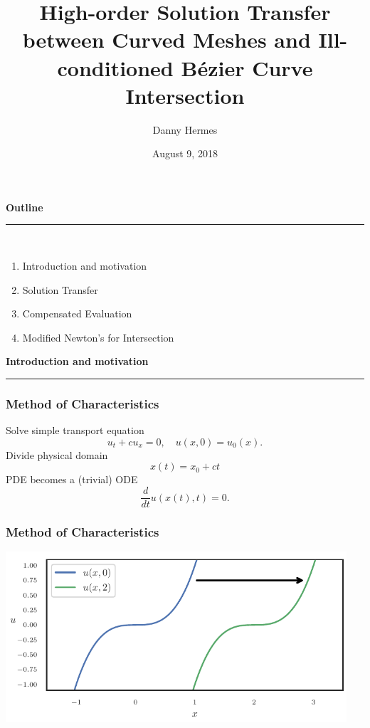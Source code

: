 \documentclass{beamer}
\title[Lagrange and B\'{e}zier]
  {High-order Solution Transfer between Curved Meshes and
  Ill-conditioned B\'{e}zier Curve Intersection}
\date{August 9, 2018}
\author{Danny Hermes}
\institute{{\lmss dhermes@berkeley.edu} \\
           UC Berkeley}
\begin{document}
\maketitle

\begin{frame}
\centering
{\Large\bf Outline} \\
\rule{0.82\textwidth}{1pt} \\[20pt]
\begin{minipage}{0.78\textwidth}\raggedright
\begin{enumerate}
\item Introduction and motivation
\item Solution Transfer
\item Compensated Evaluation
\item Modified Newton's for Intersection
\end{enumerate}
\end{minipage}
\end{frame}


\begin{frame}
\centering
{\Large \bf Introduction and motivation}
\rule{0.82\textwidth}{1pt}
\end{frame}

\begin{frame}
\frametitle{Method of Characteristics}
\pause
Solve simple transport equation
\begin{equation*}
u_t + c u_x = 0, \quad u(x, 0) = u_0(x).
\end{equation*}
\pause
Divide physical domain
\begin{equation*}
x(t) = x_0 + ct
\end{equation*}
\pause
PDE becomes a (trivial) ODE
\begin{equation*}
\frac{d}{dt} u(x(t), t) = 0.
\end{equation*}
\end{frame}

\begin{frame}
\frametitle{Method of Characteristics}
\begin{center}
\includegraphics[width=0.95\textwidth]
                {../images/solution-transfer/simple_transport.pdf}
\end{center}
\end{frame}
\end{document}
